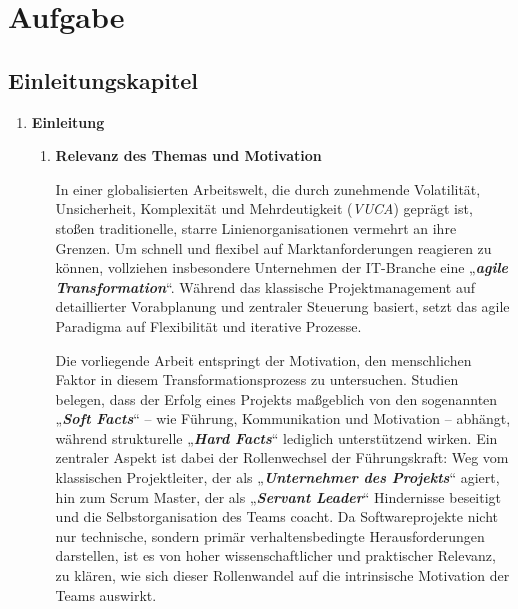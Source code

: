 
\chapter{Aufgabe}
\label{chap:4 Aufgabe}
\thispagestyle{fancy}
\section{Einleitungskapitel} 
\begin{enumerate}[label=\thechapter.\arabic*), leftmargin=*]
    \item \textbf{Einleitung}
    \begin{enumerate}[label=\thechapter.\arabic{enumi}.\arabic*), leftmargin=*]
        \item \textbf{Relevanz des Themas und Motivation} \par In einer globalisierten Arbeitswelt, die durch zunehmende Volatilität, Unsicherheit, Komplexität und Mehrdeutigkeit (\textit{\acs{VUCA}}) geprägt ist, stoßen traditionelle, starre Linienorganisationen vermehrt an ihre Grenzen. Um schnell und flexibel auf Marktanforderungen reagieren zu können, vollziehen insbesondere Unternehmen der \acs{IT}-Branche eine „\textbf{\textit{agile Transformation}}“. Während das klassische Projektmanagement auf detaillierter Vorabplanung und zentraler Steuerung basiert, setzt das agile Paradigma auf Flexibilität und iterative Prozesse. \par Die vorliegende Arbeit entspringt der Motivation, den menschlichen Faktor in diesem Transformationsprozess zu untersuchen. Studien belegen, dass der Erfolg eines Projekts maßgeblich von den sogenannten „\textbf{\textit{Soft Facts}}“ – wie Führung, Kommunikation und Motivation – abhängt, während strukturelle „\textbf{\textit{Hard Facts}}“ lediglich unterstützend wirken. Ein zentraler Aspekt ist dabei der Rollenwechsel der Führungskraft: Weg vom klassischen Projektleiter, der als „\textbf{\textit{Unternehmer des Projekts}}“ agiert, hin zum Scrum Master, der als „\textbf{\textit{Servant Leader}}“ Hindernisse beseitigt und die Selbstorganisation des Teams coacht. Da Softwareprojekte nicht nur technische, sondern primär verhaltensbedingte Herausforderungen darstellen, ist es von hoher wissenschaftlicher und praktischer Relevanz, zu klären, wie sich dieser Rollenwandel auf die intrinsische Motivation der Teams auswirkt.

\end{enumerate}
\end{enumerate}
